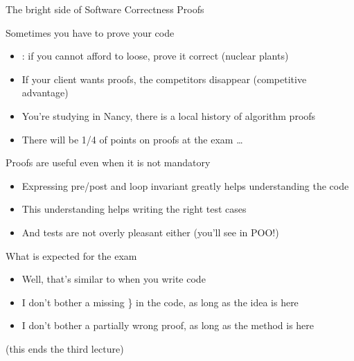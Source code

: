 \begin{frame}{The bright side of Software Correctness Proofs}
  \begin{block}{Sometimes you \alert{have to} prove your code}
    \begin{itemize}
    \item {}: if you cannot afford to loose, prove it correct
      {\small (nuclear plants)}
    \item If your client wants proofs, the competitors disappear
      {\small(competitive advantage)}
    \item You're studying in Nancy, there is a local history of algorithm proofs
    \item There will be 1/4 of points on proofs at the exam \ldots
    \end{itemize}
  \end{block}\vspace{-.2\baselineskip}

  \begin{block}{Proofs are useful even when it is not mandatory}
    \begin{itemize}
    \item Expressing pre/post and loop invariant greatly helps understanding the code
    \item This understanding helps writing the right test cases
    \item And tests are not overly pleasant either (you'll see in POO!)
    \end{itemize}
  \end{block}\vspace{-.2\baselineskip}

  \begin{block}{What is expected for the exam}
    \begin{itemize}
    \item Well, that's similar to when you write code
    \item I don't bother a missing \} in the code, as long as the idea is here
    \item I don't bother a partially wrong proof, as long as the method is here
    \end{itemize}
  \end{block}\vspace{-.5\baselineskip}

  \begin{flushright}
    (this ends the third lecture)    
  \end{flushright}

\end{frame}
